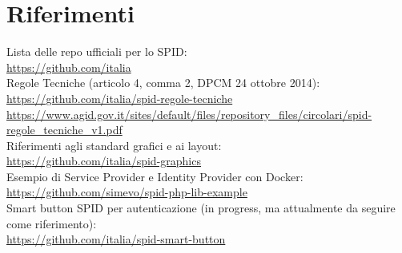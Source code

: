 \section{Riferimenti}
Lista delle repo ufficiali per lo SPID:
\\ \url{https://github.com/italia}
\\ Regole Tecniche (articolo 4, comma 2, DPCM 24 ottobre 2014):
\\ \url{https://github.com/italia/spid-regole-tecniche}
\\ \url{https://www.agid.gov.it/sites/default/files/repository_files/circolari/spid-regole_tecniche_v1.pdf}
\\ Riferimenti agli standard grafici e ai layout:
\\ \url{https://github.com/italia/spid-graphics}
\\ Esempio di Service Provider e Identity Provider con Docker:
\\ \url{https://github.com/simevo/spid-php-lib-example}
\\ Smart button SPID per autenticazione (in progress, ma attualmente da seguire come riferimento):
\\ \url{https://github.com/italia/spid-smart-button}



